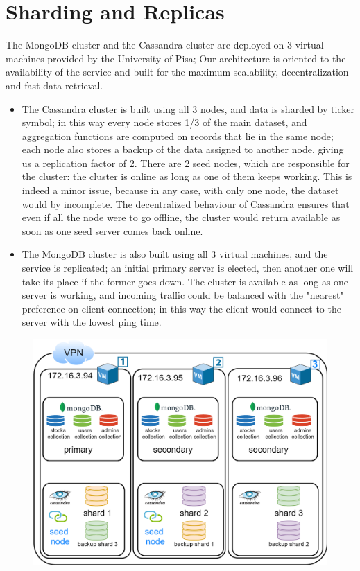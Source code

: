\section{Sharding and Replicas}
The MongoDB cluster and the Cassandra cluster are deployed on 3 virtual machines
provided by the University of Pisa; Our architecture is oriented to the
availability of the service and built for the maximum scalability,
decentralization and fast data retrieval.
\begin{itemize}
    \item The Cassandra cluster is built using all 3 nodes, and data is sharded
    by ticker symbol; in this way every node stores 1/3 of the main dataset,
    and aggregation functions are computed on records that lie in the same node;
    each node also stores a backup of the data assigned to another node, giving
    us a replication factor of 2. There are 2 seed nodes, which are responsible
    for the cluster: the cluster is online as long as one of them keeps working.
    This is indeed a minor issue, because in any case, with only one node, the
    dataset would by incomplete. The decentralized behaviour of Cassandra
    ensures that even if all the node were to go offline, the cluster would
    return available as soon as one seed server comes back online. 
    \item The MongoDB cluster is also built using all 3 virtual machines, and
    the service is replicated; an initial primary server is elected, then
    another one will take its place if the former goes down. The cluster is
    available as long as one server is working, and incoming traffic could be
    balanced with the "nearest" preference on client connection; in this way the
    client would connect to the server with the lowest ping time.
\end{itemize}
\begin{figure}[H]
	\begin{center}
		\includegraphics[scale=0.2]{img/cluster_diagram.png}
	\end{center}
\end{figure}

